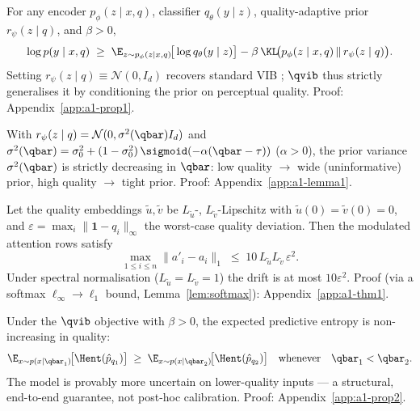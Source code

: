 
\begin{proposition}\label{prop:elbo}
For any encoder $p_\phi(z\mid x,q)$, classifier $q_\theta(y\mid z)$, quality-adaptive prior
$r_\psi(z\mid q)$, and $\beta>0$,
\begin{equation}
\log p(y\mid x,q) \;\geq\;
\E_{z\sim p_\phi(z\mid x,q)}\!\big[\log q_\theta(y\mid z)\big]
- \beta\,\KL\!\big(p_\phi(z\mid x,q)\,\|\,r_\psi(z\mid q)\big).
\label{eq:elbo}
\end{equation}
Setting $r_\psi(z\mid q)\equiv\mathcal{N}(0,I_d)$ recovers standard VIB \citep{alemi2017deep};
$\qvib$ thus strictly generalises it by conditioning the prior on perceptual quality.
Proof: Appendix~\ref{app:a1-prop1}.
\end{proposition}

\begin{lemma}\label{lem:mono}
With $r_\psi(z\mid q)=\mathcal{N}(0,\sigma^2(\qbar)I_d)$ and
$\sigma^2(\qbar)=\sigma_0^2+(1-\sigma_0^2)\,\sigmoid(-\alpha(\qbar-\tau))$ ($\alpha>0$), the prior
variance $\sigma^2(\qbar)$ is strictly decreasing in $\qbar$: low quality $\to$ wide
(uninformative) prior, high quality $\to$ tight prior. Proof: Appendix~\ref{app:a1-lemma1}.
\end{lemma}

\begin{theorem}\label{thm:drift}
Let the quality embeddings $\tilde{u},\tilde{v}$ be $L_{\tilde{u}}$-, $L_{\tilde{v}}$-Lipschitz with
$\tilde{u}(0)=\tilde{v}(0)=0$, and $\varepsilon=\max_i\|\mathbf{1}-q_i\|_\infty$ the worst-case
quality deviation. Then the modulated attention rows satisfy
\begin{equation}
\max_{1\leq i\leq n}\|a'_i-a_i\|_1 \;\leq\; 10\,L_{\tilde{u}}L_{\tilde{v}}\,\varepsilon^2.
\label{eq:drift}
\end{equation}
Under spectral normalisation ($L_{\tilde{u}}=L_{\tilde{v}}=1$) the drift is at most $10\varepsilon^2$.
Proof (via a softmax $\ell_\infty\!\to\!\ell_1$ bound, Lemma~\ref{lem:softmax}):
Appendix~\ref{app:a1-thm1}.
\end{theorem}

\begin{proposition}\label{prop:entmono}
Under the $\qvib$ objective with $\beta>0$, the expected predictive entropy is non-increasing in
quality:
\begin{equation}
\E_{x\sim p(x\mid\qbar_1)}\!\big[\Hent(\hat{p}_{q_1})\big]
\;\geq\; \E_{x\sim p(x\mid\qbar_2)}\!\big[\Hent(\hat{p}_{q_2})\big]
\quad\text{whenever}\quad \qbar_1<\qbar_2.
\label{eq:entmono}
\end{equation}
The model is provably more uncertain on lower-quality inputs --- a structural, end-to-end
guarantee, not post-hoc calibration. Proof: Appendix~\ref{app:a1-prop2}.
\end{proposition}
